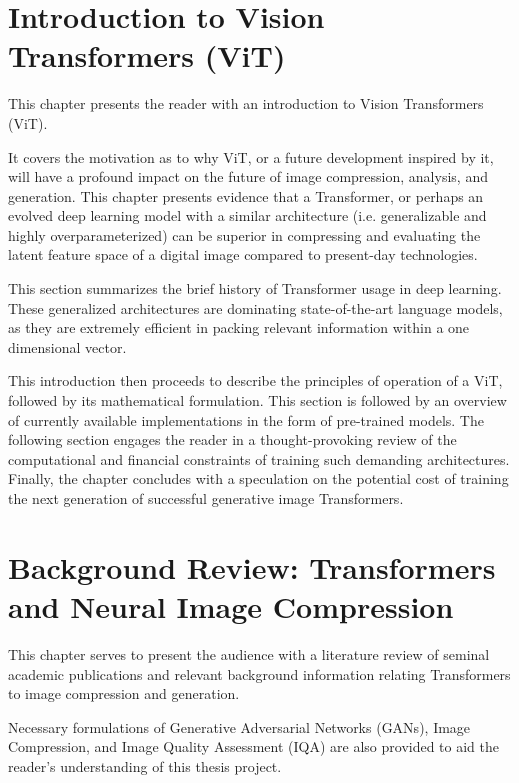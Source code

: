 \documentclass[pdftex,11pt,titlepage,twoside,openright]{report}
\begin{document}

\chapter{Introduction to Vision Transformers (ViT)}


This chapter presents the reader with an introduction to Vision Transformers (ViT).

It covers the motivation as to why ViT, or a future development inspired by it,
will have a profound impact on the future of image compression, analysis, and generation.
This chapter presents evidence that a Transformer, or perhaps an evolved deep learning model with a
similar architecture (i.e. generalizable and highly overparameterized) can be superior in
compressing and evaluating the latent feature space of a digital image compared to present-day
technologies.

This section summarizes the brief history of Transformer usage in deep learning.
These generalized architectures are dominating state-of-the-art language models,
as they are extremely efficient in packing relevant information within a one dimensional vector.

This introduction then proceeds to describe the principles of operation of a ViT, 
followed by its mathematical formulation. This section is followed by an overview of currently 
available implementations in the form of pre-trained models. The following section engages the reader in a
thought-provoking review of the computational and financial constraints of training such demanding 
architectures. Finally, the chapter concludes with a speculation on the potential cost of 
training the next generation of successful generative image Transformers.

\ThinHRule

\newpage



\chapter{Background Review: Transformers and Neural Image Compression}


This chapter serves to present the audience with a literature review of seminal academic
publications and relevant background information relating Transformers to image 
compression and generation.

Necessary formulations of Generative Adversarial Networks (GANs),
Image Compression, and Image Quality Assessment (IQA)
are also provided to aid the reader's understanding of this thesis project.
\end{document}

